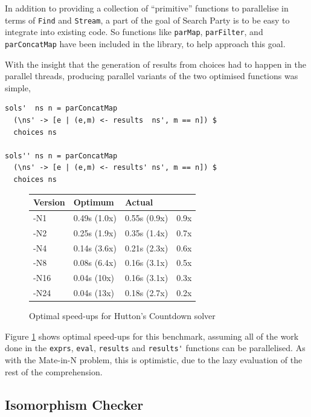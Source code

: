 In addition to providing a collection of ``primitive'' functions to
parallelise in terms of \verb|Find| and \verb|Stream|, a part of the
goal of Search Party is to be easy to integrate into existing code.
So functions like \verb|parMap|, \verb|parFilter|, and
\verb|parConcatMap| have been included in the library, to help
approach this goal.

With the insight that the generation of results from choices had to
happen in the parallel threads, producing parallel variants of the two
optimised functions was simple,

\begin{verbatim}
sols'  ns n = parConcatMap
  (\ns' -> [e | (e,m) <- results  ns', m == n]) $
  choices ns

sols'' ns n = parConcatMap
  (\ns' -> [e | (e,m) <- results' ns', m == n]) $
  choices ns
\end{verbatim}

\begin{figure}[t]
  \centering
  \begin{tabularx}{\linewidth}{|X|X|X|X|}
    \hline \textbf{Version} & \textbf{Optimum} & \textbf{Actual} & \\
    \hline -N1  & 0.49s (1.0x) & 0.55s (0.9x) & 0.9x \\
           -N2  & 0.25s (1.9x) & 0.35s (1.4x) & 0.7x \\
           -N4  & 0.14s (3.6x) & 0.21s (2.3x) & 0.6x \\
           -N8  & 0.08s (6.4x) & 0.16s (3.1x) & 0.5x \\
           -N16 & 0.04s (10x)  & 0.16s (3.1x) & 0.3x \\
           -N24 & 0.04s (13x)  & 0.18s (2.7x) & 0.2x \\
    \hline
  \end{tabularx}
  \caption{Optimal speed-ups for Hutton's Countdown solver}
  \label{fig:searchparty-examples-hutton-amdahl}
\end{figure}

Figure \ref{fig:searchparty-examples-hutton-amdahl} shows optimal
speed-ups for this benchmark, assuming all of the work done in the
\verb|exprs|, \verb|eval|, \verb|results| and \verb|results'|
functions can be parallelised. As with the Mate-in-N problem, this is
optimistic, due to the lazy evaluation of the rest of the
comprehension.

\subsection*{Isomorphism Checker}
\label{sec:searchparty-examples-isos}

